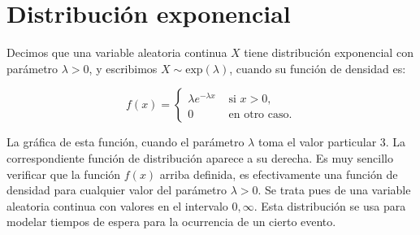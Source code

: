 \section{Distribuci\'on exponencial}

Decimos que una variable aleatoria continua $X$ tiene distribución exponencial
con parámetro $\lambda > 0$, y escribimos $X \sim \text{exp}(\lambda)$, cuando
su función de densidad es:

\begin{equation}
    f(x) = \left\lbrace \begin{array}{ll}
        \lambda e^{-\lambda x} & \text{ si } x>0, \\
        0 & \text{ en otro caso.}
    \end{array}\right.
\end{equation}

La gráfica de esta función, cuando el parámetro $\lambda$ toma el valor
particular 3. La correspondiente función de distribución aparece a su derecha.
Es muy sencillo verificar que la función $f(x)$ arriba definida, es
efectivamente una función de densidad para cualquier valor del parámetro
$\lambda > 0$. Se trata pues de una variable aleatoria continua con valores en
el intervalo $0, \infty$. Esta distribución se usa para modelar tiempos de
espera para la ocurrencia de un cierto evento.

